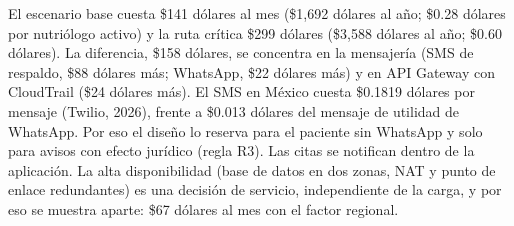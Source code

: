\documentclass[12pt, a4paper]{article}
\begin{document}
El escenario base cuesta \$141 dólares al mes (\$1,692 dólares al año;
\$0.28 dólares por nutriólogo activo) y la ruta crítica \$299 dólares
(\$3,588 dólares al año; \$0.60 dólares). La diferencia, \$158 dólares,
se concentra en la mensajería (SMS de respaldo, \$88 dólares más;
WhatsApp, \$22 dólares más) y en API Gateway con CloudTrail (\$24
dólares más). El SMS en México cuesta \$0.1819 dólares por mensaje
(Twilio, 2026), frente a \$0.013 dólares del mensaje de utilidad de
WhatsApp. Por eso el diseño lo reserva para el paciente sin WhatsApp y
solo para avisos con efecto jurídico (regla R3). Las citas se notifican
dentro de la aplicación. La alta disponibilidad (base de datos en dos
zonas, NAT y punto de enlace redundantes) es una decisión de servicio,
independiente de la carga, y por eso se muestra aparte: \$67 dólares al
mes con el factor regional.
 
\end{document}
